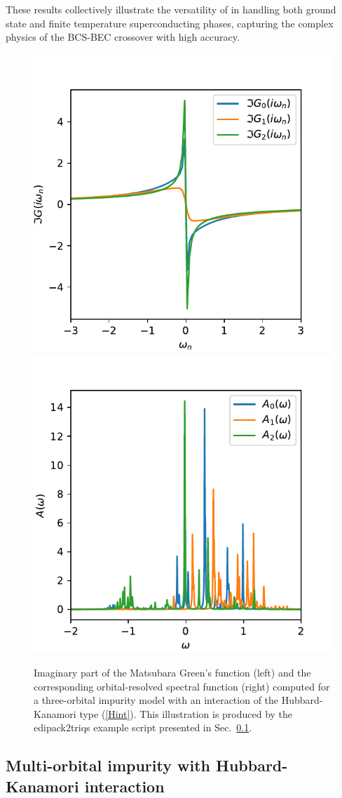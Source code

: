 \documentclass[edipack2.tex]{subfiles}
\begin{document}
These results collectively illustrate the versatility of \NAME in 
handling both ground state and finite temperature superconducting 
phases, capturing the complex physics of the BCS-BEC crossover with 
high accuracy.


\begin{figure}[t!]
    \includegraphics[width=0.5\linewidth]
        {edipack2_examples/edipack2triqs/G_iw.pdf}
    \includegraphics[width=0.5\linewidth]
        {edipack2_examples/edipack2triqs/A_w.pdf}
    \caption{\label{figEx3}%
        Imaginary part of the Matsubara Green's function (left) and the
        corresponding orbital-resolved spectral function (right) computed for a
        three-orbital impurity model with an interaction of the Hubbard-Kanamori
        type (\ref{Hint}). This illustration is produced by the edipack2triqs
        example script presented in Sec.~\ref{SecExamplesTRIQS}.
    }
\end{figure}

\subsection{Multi-orbital impurity with Hubbard-Kanamori interaction}
\label{SecExamplesTRIQS}
\end{document}

